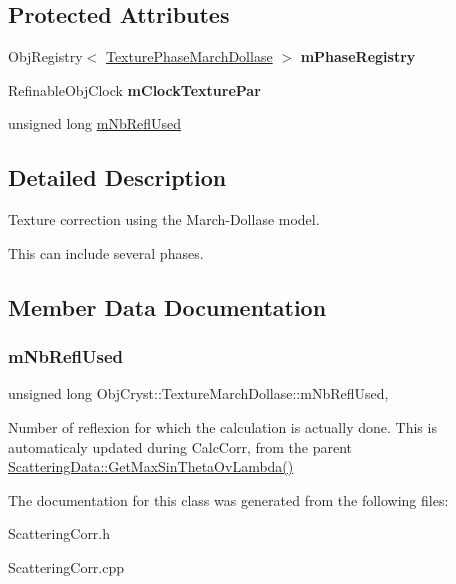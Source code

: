 \subsection*{Protected Attributes}
\begin{DoxyCompactItemize}
\item 
\mbox{\label{class_obj_cryst_1_1_texture_march_dollase_a5036a20bd0edc8c003c317ca3d11bd85}} 
Obj\+Registry$<$ \mbox{\hyperlink{struct_obj_cryst_1_1_texture_phase_march_dollase}{Texture\+Phase\+March\+Dollase}} $>$ {\bfseries m\+Phase\+Registry}
\item 
\mbox{\label{class_obj_cryst_1_1_texture_march_dollase_aa2c0a0db3b5c9178d1d61125ac72349e}} 
Refinable\+Obj\+Clock {\bfseries m\+Clock\+Texture\+Par}
\item 
unsigned long \mbox{\hyperlink{class_obj_cryst_1_1_texture_march_dollase_a243ea853b7d3179f9474386ed296783c}{m\+Nb\+Refl\+Used}}
\end{DoxyCompactItemize}


\subsection{Detailed Description}
Texture correction using the March-\/\+Dollase model.

This can include several phases. 

\subsection{Member Data Documentation}
\mbox{\label{class_obj_cryst_1_1_texture_march_dollase_a243ea853b7d3179f9474386ed296783c}} 
\subsubsection{\texorpdfstring{mNbReflUsed}{mNbReflUsed}}
{\footnotesize\ttfamily unsigned long Obj\+Cryst\+::\+Texture\+March\+Dollase\+::m\+Nb\+Refl\+Used\hspace{0.3cm}{\ttfamily [mutable]}, {\ttfamily [protected]}}

Number of reflexion for which the calculation is actually done. This is automaticaly updated during Calc\+Corr, from the parent \mbox{\hyperlink{class_obj_cryst_1_1_scattering_data_a395dc507584a607250616000aec3c76f}{Scattering\+Data\+::\+Get\+Max\+Sin\+Theta\+Ov\+Lambda()}} 

The documentation for this class was generated from the following files\+:\begin{DoxyCompactItemize}
\item 
Scattering\+Corr.\+h\item 
Scattering\+Corr.\+cpp\end{DoxyCompactItemize}
